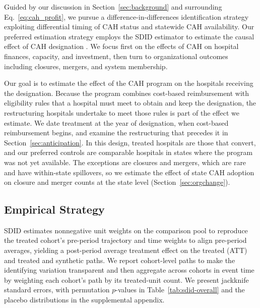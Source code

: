 \documentclass[a4paper, 12pt, twoside]{article}
\begin{document}
Guided by our discussion in Section~\ref{sec:background} and surrounding Eq.~\eqref{eq:cah_profit}, we pursue a difference-in-differences identification strategy exploiting differential timing of CAH status and statewide CAH availability. Our preferred estimation strategy employs the SDID estimator to estimate the causal effect of CAH designation \citep{arkhangelsky2021}. We focus first on the effects of CAH on hospital finances, capacity, and investment, then turn to organizational outcomes including closures, mergers, and system membership.

Our goal is to estimate the effect of the CAH program on the hospitals receiving the designation. Because the program combines cost-based reimbursement with eligibility rules that a hospital must meet to obtain and keep the designation, the restructuring hospitals undertake to meet those rules is part of the effect we estimate. We date treatment at the year of designation, when cost-based reimbursement begins, and examine the restructuring that precedes it in Section~\ref{sec:anticipation}. In this design, treated hospitals are those that convert, and our preferred controls are comparable hospitals in states where the program was not yet available. The exceptions are closures and mergers, which are rare and have within-state spillovers, so we estimate the effect of state CAH adoption on closure and merger counts at the state level (Section~\ref{sec:orgchange}).

\subsection{Empirical Strategy}
\label{sec:design-methods}

SDID estimates nonnegative unit weights on the comparison pool to reproduce the treated cohort’s pre-period trajectory and time weights to align pre-period averages, yielding a post-period average treatment effect on the treated (ATT) and treated and synthetic paths. We report cohort-level paths to make the identifying variation transparent and then aggregate across cohorts in event time by weighting each cohort’s path by its treated-unit count. We present jackknife standard errors, with permutation $p$-values in Table~\ref{tab:sdid-overall} and the placebo distributions in the supplemental appendix.
\end{document}
